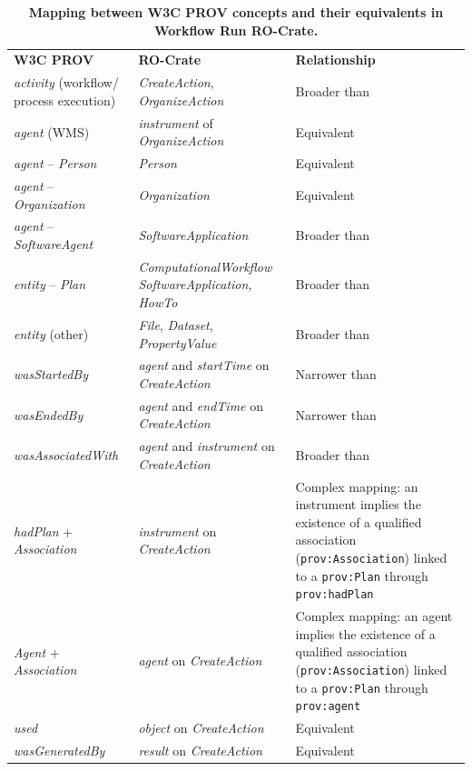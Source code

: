 \documentclass[10pt,letterpaper]{article}
\newlength\savedwidth
\newcommand\thickhline{\noalign{\global\savedwidth\arrayrulewidth\global\arrayrulewidth 2pt}%
\hline
\noalign{\global\arrayrulewidth\savedwidth}}
\begin{document}
\begin{table}[!ht]
  \begin{adjustwidth}{-1.5cm}{0in}
  \centering
  \caption{
  {\bf Mapping between W3C PROV concepts and their equivalents in Workflow Run RO-Crate.}}
  \begin{tabular}{p{35mm}|p{40mm}|p{40mm}}
  \hline
  {\bf W3C PROV} & {\bf RO-Crate} & \textbf{Relationship} \\
  \thickhline
  

  \emph{activity} (workflow/ \newline process execution) 
    & \emph{CreateAction}, \emph{OrganizeAction} & Broader than \\ \hline
  \emph{agent} (WMS) & \emph{instrument} of \emph{OrganizeAction} & Equivalent \\ \hline
  \emph{agent} -- \emph{Person} & \emph{Person}  & Equivalent \\ \hline
  \emph{agent} -- \emph{Organization} & \emph{Organization}  & Equivalent \\ \hline
  \emph{agent} -- \emph{SoftwareAgent} & \emph{SoftwareApplication}  & Broader than \\ \hline
  \emph{entity} -- \emph{Plan} & 
    \emph{ComputationalWorkflow} \emph{SoftwareApplication, HowTo}  
    & Broader than \\ \hline
  \emph{entity} (other) & \emph{File}, \emph{Dataset}, \emph{PropertyValue} & Broader than \\ \hline
  \emph{wasStartedBy} & \emph{agent} and \emph{startTime} on  \emph{CreateAction} & Narrower than  \\ \hline
  \emph{wasEndedBy} & \emph{agent} and \emph{endTime} on  \emph{CreateAction} & Narrower than \\ \hline
  \emph{wasAssociatedWith} & \emph{agent} and \emph{instrument} on  \emph{CreateAction} & Broader than \\ \hline
  \emph{hadPlan} + \emph{Association} &  \emph{instrument} on \emph{CreateAction} & 
    Complex mapping: an instrument implies the existence of a qualified association (\texttt{prov:Association}) linked to a \texttt{prov:Plan} through \texttt{prov:hadPlan}
    \\ \hline
  \emph{Agent} + \emph{Association} &  \emph{agent} on \emph{CreateAction} & 
    Complex mapping: an agent implies the existence of a qualified association (\texttt{prov:Association}) linked to a \texttt{prov:Plan} through \texttt{prov:agent}
    \\ \hline  
  \emph{used} & \emph{object} on \emph{CreateAction} & Equivalent \\ \hline 
  \emph{wasGeneratedBy} & \emph{result} on  \emph{CreateAction} & Equivalent \\ \hline
  

\end{tabular}
\end{adjustwidth}
\end{table}
\end{document}
